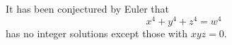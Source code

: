 \begin{conjecture}
    It has been conjectured by Euler that
\[
    x^4+y^4+z^4=w^4
\]
    has no integer solutions except those with $xyz=0$.
\end{conjecture}

